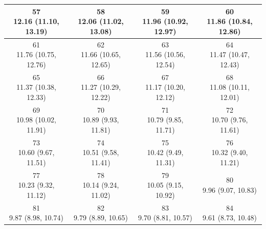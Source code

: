 \begin{table}[htbp]
\begin{tabular}{cccc}
\hline
\shortstack[c]{57\\12.16 (11.10, 13.19)} & \shortstack[c]{58\\12.06 (11.02, 13.08)} & \shortstack[c]{59\\11.96 (10.92, 12.97)} & \shortstack[c]{60\\11.86 (10.84, 12.86)} \\
\hline
\shortstack[c]{61\\11.76 (10.75, 12.76)} & \shortstack[c]{62\\11.66 (10.65, 12.65)} & \shortstack[c]{63\\11.56 (10.56, 12.54)} & \shortstack[c]{64\\11.47 (10.47, 12.43)} \\
\hline
\shortstack[c]{65\\11.37 (10.38, 12.33)} & \shortstack[c]{66\\11.27 (10.29, 12.22)} & \shortstack[c]{67\\11.17 (10.20, 12.12)} & \shortstack[c]{68\\11.08 (10.11, 12.01)} \\
\hline
\shortstack[c]{69\\10.98 (10.02, 11.91)} & \shortstack[c]{70\\10.89 (9.93, 11.81)} & \shortstack[c]{71\\10.79 (9.85, 11.71)} & \shortstack[c]{72\\10.70 (9.76, 11.61)} \\
\hline
\shortstack[c]{73\\10.60 (9.67, 11.51)} & \shortstack[c]{74\\10.51 (9.58, 11.41)} & \shortstack[c]{75\\10.42 (9.49, 11.31)} & \shortstack[c]{76\\10.32 (9.40, 11.21)} \\
\hline
\shortstack[c]{77\\10.23 (9.32, 11.12)} & \shortstack[c]{78\\10.14 (9.24, 11.02)} & \shortstack[c]{79\\10.05 (9.15, 10.92)} & \shortstack[c]{80\\9.96 (9.07, 10.83)} \\
\hline
\shortstack[c]{81\\9.87 (8.98, 10.74)} & \shortstack[c]{82\\9.79 (8.89, 10.65)} & \shortstack[c]{83\\9.70 (8.81, 10.57)} & \shortstack[c]{84\\9.61 (8.73, 10.48)} \\

\end{tabular}
\end{table}
